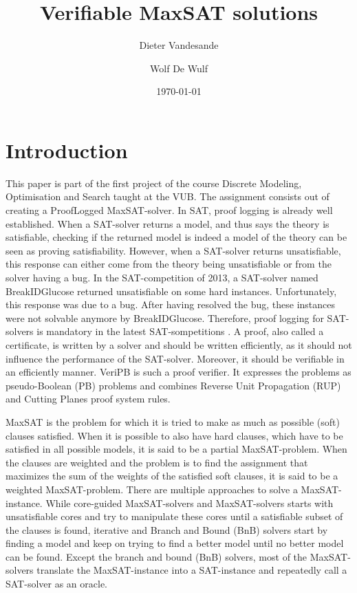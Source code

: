 \documentclass{article}
\title{Verifiable MaxSAT solutions}
\author{Dieter Vandesande \and Wolf De Wulf}
\date{\today}
\theoremstyle{mytheoremstyle}
\theoremstyle{mytheoremstyle}
\theoremstyle{myproblemstyle}
\begin{document}
\maketitle

\section{Introduction}
\label{sec:intro}
This paper is part of the first project of the course Discrete Modeling, Optimisation and Search taught at the VUB. The assignment consists out of creating a ProofLogged MaxSAT-solver. In SAT, proof
logging is already well established. When a SAT-solver returns a model, and thus says the theory is satisfiable, checking if the returned model is indeed a model of the theory can be seen as proving
satisfiability. However, when a SAT-solver returns unsatisfiable, this response can either come from the theory being unsatisfiable or from the solver having a bug. In the SAT-competition of 2013, a
SAT-solver named BreakIDGlucose returned unsatisfiable on some hard instances. Unfortunately, this response was due to a bug. After having resolved the bug, these instances were not solvable anymore
by BreakIDGlucose. Therefore, proof logging for SAT-solvers is mandatory in the latest SAT-sompetitions \autocite{satcomp2018}. A proof, also called a certificate, is written by a solver and should
be written efficiently, as it should not influence the performance of the SAT-solver. Moreover, it should be verifiable in an efficiently manner. VeriPB \autocite{veripb} is such a proof verifier. It
expresses the problems as pseudo-Boolean (PB) problems and combines Reverse Unit Propagation (RUP) and Cutting Planes proof system rules. \newline \par
MaxSAT \autocite{li2009maxsat, biere2009handbook} is the problem for which it is tried to make as much as possible (soft) clauses satisfied. When it is possible to also have hard clauses, which have
to be satisfied in all possible models, it is said to be a partial MaxSAT-problem. When the clauses are weighted and the problem is to find the assignment that maximizes the sum of the weights of the
satisfied soft clauses, it is said to be a weighted MaxSAT-problem. There are multiple approaches to solve a MaxSAT-instance.  While core-guided MaxSAT-solvers and MaxSAT-solvers starts with
unsatisfiable cores and try to manipulate these cores until a satisfiable subset of the clauses is found, iterative \autocite{qmaxsat} and Branch and Bound (BnB) \autocite{maxcdcl, ahmaxsat} solvers
start by finding a model and keep on trying to find a better model until no better model can be found. Except the branch and bound (BnB) solvers, most of the MaxSAT-solvers translate the
MaxSAT-instance into a SAT-instance and repeatedly call a SAT-solver as an oracle. \newline \par
\end{document}
